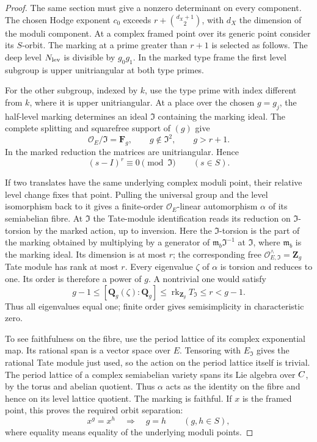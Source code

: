\begin{proof}
The same section must give a nonzero determinant on every component.
The chosen Hodge exponent \(c_0\) exceeds
\(r+\binom{d_X+1}{2}\), with \(d_X\) the dimension of the
moduli component. At a complex framed point over its generic
point consider its \(S\)-orbit. The marking at a prime
greater than \(r+1\) is selected as follows. The deep level
\(N_{\rm lev}\) is divisible by \(g_0g_1\). In the marked type frame the first
level subgroup is upper unitriangular at both type primes.

For the other subgroup, indexed by \(k\), use the type prime
with index different from \(k\), where it is upper
unitriangular. At a place over the chosen \(g=g_j\), the
half-level marking determines an ideal \(\mathfrak I\) containing
the marking ideal. The complete splitting and squarefree
support of \((g)\) give
\[
  \mathcal O_E/\mathfrak I=\mathbf F_g,\qquad
  g\notin\mathfrak I^2,\qquad g>r+1.
\]
In the marked reduction the matrices are unitriangular. Hence
\[
             (s-I)^r\equiv0\pmod{\mathfrak I}
                   \qquad (s\in S).
\]

If two translates have the same underlying complex moduli
point, their relative level change fixes that point. Pulling
the universal group and the level isomorphism back to it
gives a finite-order \(\mathcal O_E\)-linear automorphism
\(\alpha\) of its semiabelian fibre. At \(\mathfrak I\) the
Tate-module identification reads its reduction on
\(\mathfrak I\)-torsion by the marked action, up to inversion.
Here the \(\mathfrak I\)-torsion is the part of the marking
obtained by multiplying by a generator of
\(\mathfrak m_b\mathfrak I^{-1}\) at \(\mathfrak I\),
where \(\mathfrak m_b\) is the marking ideal. Its dimension
is at most \(r\); the corresponding free
\(\mathcal O_{E,\mathfrak I}^{\wedge}=\mathbf Z_g\) Tate module
has rank at most \(r\). Every eigenvalue \(\zeta\) of \(\alpha\)
is torsion and reduces to one. Its order is therefore a power
of \(g\). A nontrivial one would satisfy
\[
 g-1\le[\mathbf Q_g(\zeta):\mathbf Q_g]
       \le\operatorname{rk}_{\mathbf Z_g}T_{\mathfrak I}\le r<g-1 .
\]
Thus all eigenvalues equal one; finite order gives semisimplicity
in characteristic zero.

To see faithfulness on the fibre, use the period
lattice of its complex exponential map. Its rational span
is a vector space over \(E\). Tensoring with \(E_{\mathfrak I}\)
gives the rational Tate module just used, so the action on
the period lattice itself is trivial. The period lattice of
a complex semiabelian variety spans its Lie algebra over
\(C\), by the torus and abelian quotient. Thus \(\alpha\) acts as the identity on the fibre and hence on its
level lattice quotient. The marking is faithful. If \(x\) is the
framed point, this proves the required orbit separation:
\[
                x^g=x^h\quad\Longrightarrow\quad g=h
                              \qquad(g,h\in S),
\]
where equality means equality of the underlying moduli points.


\end{proof}
